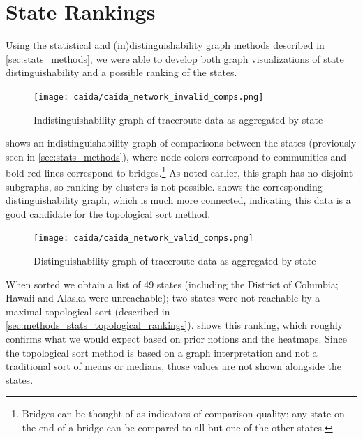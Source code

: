 \section{State Rankings}

Using the statistical and (in)distinguishability graph methods described in \cref{sec:stats_methods}, we were able to develop both graph visualizations of state distinguishability and a possible ranking of the states.

\begin{figure}[htb]
    \centering
    \texttt{[image: caida/caida\_network\_invalid\_comps.png]}
    \caption{Indistinguishability graph of traceroute data as aggregated by state}
    \label{fig:caida_network_invalid_comps}
\end{figure}

 shows an indistinguishability graph of comparisons between the states (previously seen in \cref{sec:stats_methods}), where node colors correspond to communities and bold red lines correspond to bridges.\footnote{Bridges can be thought of as indicators of comparison quality; any state on the end of a bridge can be compared to all but one of the other states.} As noted earlier, this graph has no disjoint subgraphs, so ranking by clusters is not possible.  shows the corresponding distinguishability graph, which is much more connected, indicating this data is a good candidate for the topological sort method.

\begin{figure}[htb]
    \centering
    \texttt{[image: caida/caida\_network\_valid\_comps.png]}
    \caption{Distinguishability graph of traceroute data as aggregated by state}
    \label{fig:caida_network_valid_comps}
\end{figure}

When sorted we obtain a list of 49 states (including the District of Columbia; Hawaii and Alaska were unreachable); two states were not reachable by a maximal topological sort (described in \cref{sec:methods_stats_topological_rankings}).  shows this ranking, which roughly confirms what we would expect based on prior notions and the heatmaps. Since the topological sort method is based on a graph interpretation and not a traditional sort of means or medians, those values are not shown alongside the states.



